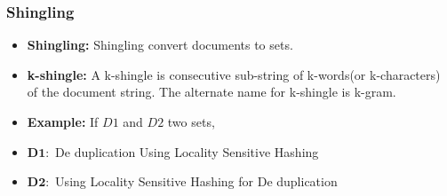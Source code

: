 \documentclass[15pt,t]{beamer}
\begin{document}
\begin{frame}
		\frametitle{Shingling} 
		\begin{itemize}[topsep=0pt,itemsep=0ex,partopsep=1ex,parsep=1ex]
			\item [$\square$] \textbf{Shingling:} Shingling convert documents to sets.
			\item [$\square$] \textbf{k-shingle:} A k-shingle is consecutive sub-string of k-words(or k-characters) of the document string. The alternate name for k-shingle is k-gram.
			\item [$\square$] \textbf{Example:} If $D1$ and $D2$ two sets, 
			\item $\bm{D1:}$ De duplication  Using Locality Sensitive Hashing
			\item $\bm{D2:}$ Using Locality Sensitive Hashing for De duplication
			
		\end{itemize}
\end{frame}
\end{document}
